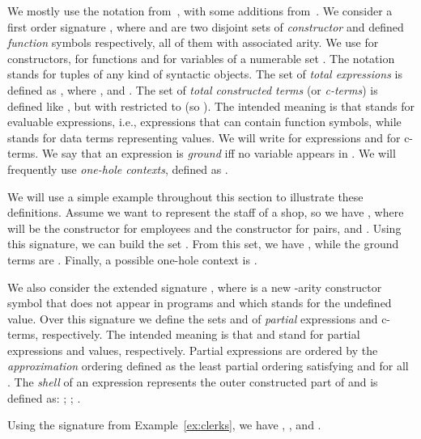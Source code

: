 

We mostly use the notation from~\cite{baader-nipkow}, with some additions from~\cite{Lopez-FraguasRS09-RTA09}. 
We consider a first order signature , where  and  are two disjoint
sets of \emph{constructor} and defined \emph{function} symbols respectively, all of them with associated
arity. We use  for constructors,  for functions and  for variables of a
numerable set  . The notation  stands for tuples of any kind of syntactic objects. 
The set  of {\it total expressions} is defined as , where 
,  and . The set  of
{\it total constructed terms}
(or {\it  c-terms}) is defined like , but with  restricted to  (so ).
The intended meaning is that  stands for evaluable expressions, i.e., expressions that can contain 
function symbols, while  stands for data terms representing {values}. 
We will write  for expressions and  for c-terms. 
We say that an expression  is \emph{ground} iff no variable appears in . 
We will frequently use \emph{one-hole contexts}, defined as . 


\begin{example}\label{ex:clerks}
We will use a simple example throughout this section to illustrate these definitions. Assume we want to represent
the staff of a shop, so we have 
  ,
where  will be the constructor for employees and  the constructor for pairs, and
.
Using this signature, we can build the set   . From this set, we have ,
while the ground terms are  .
Finally, a possible one-hole context is .
\end{example}

We also consider the extended signature , where  is a new -arity constructor symbol that 
does not appear in programs and which stands for the undefined value. Over this signature 
we define the sets  and  of {\it partial} expressions and c-terms, respectively.
The intended meaning is that  and  stand for 
partial expressions and values, respectively.  
Partial expressions are ordered by the {\em approximation} ordering  defined as the least
partial ordering satisfying  and 
for all .
The {\it shell}  of an expression  represents the outer constructed part
of  and is defined as: ; ; .  

\begin{example}
Using the signature from Example~\ref{ex:clerks}, we have
,
, and
.
\end{example}


